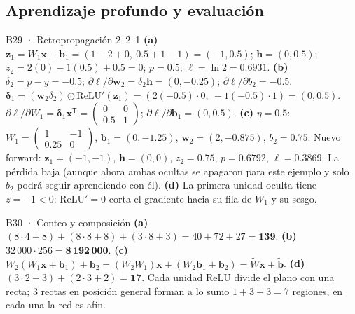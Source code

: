 \subsection{Aprendizaje profundo y evaluación}

\begin{solucion}{B29 · Retropropagación 2–2–1}
\textbf{(a)} $\mathbf z_1=W_1\mathbf x+\mathbf b_1=(1-2+0,\ 0.5+1-1)=(-1,0.5)$; $\mathbf h=(0,0.5)$; $z_2=2(0)-1(0.5)+0.5=0$; $p=0.5$; $\ell=\ln2=\mathbf{0.6931}$.
\textbf{(b)} $\delta_2=p-y=-0.5$; $\partial\ell/\partial\mathbf w_2=\delta_2\mathbf h=(0,-0.25)$; $\partial\ell/\partial b_2=-0.5$.
$\boldsymbol\delta_1=(\mathbf w_2\delta_2)\odot\mathrm{ReLU}'(\mathbf z_1)=(2(-0.5)\cdot0,\ -1(-0.5)\cdot1)=(0,0.5)$.
$\partial\ell/\partial W_1=\boldsymbol\delta_1\mathbf x^\mathsf T=\begin{pmatrix}0&0\\0.5&1\end{pmatrix}$; $\partial\ell/\partial\mathbf b_1=(0,0.5)$.
\textbf{(c)} $\eta=0.5$: $W_1=\begin{pmatrix}1&-1\\0.25&0\end{pmatrix}$, $\mathbf b_1=(0,-1.25)$, $\mathbf w_2=(2,-0.875)$, $b_2=0.75$.
Nuevo forward: $\mathbf z_1=(-1,-1)$, $\mathbf h=(0,0)$, $z_2=0.75$, $p=0.6792$, $\ell=\mathbf{0.3869}$. La pérdida baja (aunque ahora ambas ocultas se apagaron
para este ejemplo y solo $b_2$ podrá seguir aprendiendo con él).
\textbf{(d)} La primera unidad oculta tiene $z=-1<0$: ReLU$'=0$ corta el gradiente hacia su fila de $W_1$ y su sesgo.
\end{solucion}

\begin{solucion}{B30 · Conteo y composición}
\textbf{(a)} $(8\cdot4+8)+(8\cdot8+8)+(3\cdot8+3)=40+72+27=\mathbf{139}$.
\textbf{(b)} $32\,000\cdot256=\mathbf{8\,192\,000}$.
\textbf{(c)} $W_2(W_1\mathbf x+\mathbf b_1)+\mathbf b_2=(W_2W_1)\mathbf x+(W_2\mathbf b_1+\mathbf b_2)=\widetilde W\mathbf x+\widetilde{\mathbf b}$.
\textbf{(d)} $(3\cdot2+3)+(2\cdot3+2)=\mathbf{17}$. Cada unidad ReLU divide el plano con una recta; 3 rectas en posición general forman a lo sumo $1+3+3=7$ regiones, en cada una la red es afín.
\end{solucion}

